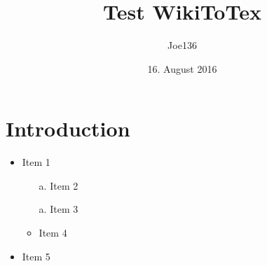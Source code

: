 \documentclass{article}
\title{Test WikiToTex}
\author{Joe136}
\date{16. August 2016}
\newcommand{\wikilist}[1]{\iffalse #1 \fi}
\begin{document}
\maketitle


\chapter{Introduction}

\wikilist{
- Item 1
-- Item 2
-- Item 3
-- Item 4
- Item 5
}
\begin{itemize}
   \item Item 1
   \begin{itemize}[itemindent=-0.4cm]
      \item[a.] Item 2
      \item[a.] Item 3
      \item Item 4
   \end{itemize}
   \item Item 5
\end{itemize}



\end{document}
